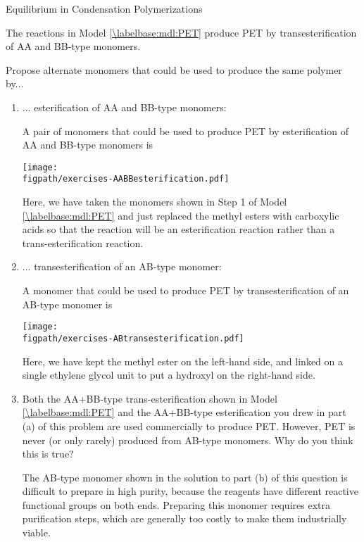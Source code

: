 \begin{activity}{Equilibrium in Condensation Polymerizations}
\begin{exercises}
\begin{solution}{}
			\end{solution}
		
	
		\exercise The reactions in Model \ref{\labelbase:mdl:PET} produce PET by transesterification of AA and BB-type monomers.
		
			Propose alternate monomers that could be used to produce the same polymer by...
			
				\begin{enumerate}
					\item ... esterification of AA and BB-type monomers:
		
			\begin{solution}{}
				A pair of monomers that could be used to produce PET by esterification of AA and BB-type monomers is
		
		\centerline{\texttt{[image: \\figpath/exercises-AABBesterification.pdf]}}
		
				Here, we have taken the monomers shown in Step 1 of Model \ref{\labelbase:mdl:PET} and just replaced the methyl esters with carboxylic acids so that the reaction will be an esterification reaction rather than a trans-esterification reaction.
				
				
			\end{solution}
			
			\item ... transesterification of an AB-type monomer:
			
			\begin{solution}{}
		
				A monomer that could be used to produce PET by transesterification of an AB-type monomer is
		
		\centerline{\texttt{[image: \\figpath/exercises-ABtransesterification.pdf]}}
		
				Here, we have kept the methyl ester on the left-hand side, and linked on a single ethylene glycol unit to put a hydroxyl on the right-hand side.		
				
			\end{solution}
			
			\item Both the AA+BB-type trans-esterification shown in Model \ref{\labelbase:mdl:PET} and the AA+BB-type esterification you drew in part (a) of this problem are used commercially to produce PET.  However, PET is never (or only rarely) produced from AB-type monomers.  Why do you think this is true?
			
				\begin{solution}{}
					The AB-type monomer shown in the solution to part (b) of this question is difficult to prepare in high purity, because the reagents have different reactive functional groups on both ends.  Preparing this monomer requires extra purification steps, which are generally too costly to make them industrially viable.
					

\end{solution}
\end{enumerate}
\end{exercises}
\end{activity}
